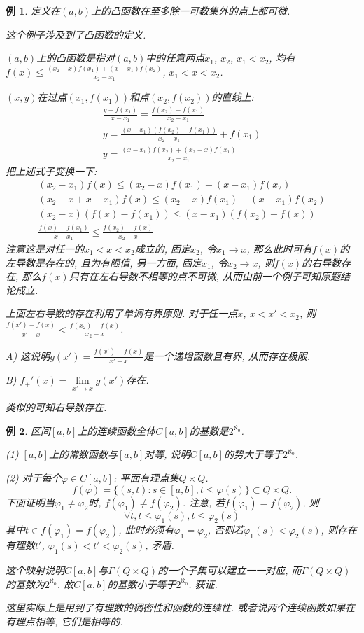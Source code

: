 \documentclass[12pt,a4paper,openany]{book}
\newtheorem{example}{例}
\begin{document}
\begin{example}
定义在$(a, b)$上的凸函数在至多除一可数集外的点上都可微.

这个例子涉及到了凸函数的定义.

$(a, b)$上的凸函数是指对$(a, b)$中的任意两点$x_1$, $x_2$, $x_1 < x_2$, 均有$f(x) \le \frac{(x_2 - x)f(x_1) + (x - x_1)f(x_2)}{x_2 - x_1}$, $x_1 < x < x_2$.

$(x, y)$在过点$(x_1, f(x_1))$和点$(x_2, f(x_2))$的直线上:
\begin{gather*}
\frac{y - f(x_1)}{x - x_1} = \frac{f(x_2) - f(x_1)}{x_2 - x_1} \\
y = \frac{(x - x_1)(f(x_2) - f(x_1))}{x_2 - x_1} + f(x_1) \\
y = \frac{(x - x_1)f(x_2) + (x_2 - x)f(x_1)}{x_2 - x_1}
\end{gather*}
把上述式子变换一下:
\begin{gather*}
(x_2 - x_1)f(x) \le (x_2 - x)f(x_1) + (x - x_1)f(x_2) \\
(x_2 - x + x - x_1)f(x) \le (x_2 - x)f(x_1) + (x - x_1)f(x_2) \\
(x_2 - x)(f(x) - f(x_1)) \le (x - x_1)(f(x_2) - f(x)) \\
\frac{f(x) - f(x_1)}{x - x_1} \le \frac{f(x_2) - f(x)}{x_2 - x}
\end{gather*}
注意这是对任一的$x_1 < x < x_2$成立的, 固定$x_2$, 令$x_1 \rightarrow x$, 那么此时可有$f(x)$的左导数是存在的, 且为有限值, 另一方面, 固定$x_1$, 令$x_2 \rightarrow x$, 则$f(x)$的右导数存在, 那么$f(x)$只有在左右导数不相等的点不可微, 从而由前一个例子可知原题结论成立. 

上面左右导数的存在利用了单调有界原则. 对于任一点$x$, $x < x' < x_2$, 则$\frac{f(x') - f(x)}{x'  - x} < \frac{f(x_2) - f(x)}{x_2 - x}$.

A) 这说明$g(x') = \frac{f(x') - f(x)}{x' - x}$是一个递增函数且有界, 从而存在极限.

B) $f_+'(x) = \lim\limits_{x' \rightarrow x}{g(x')}$存在.

类似的可知右导数存在.
\end{example}

\begin{example}
区间$[a, b]$上的连续函数全体$C[a, b]$的基数是$2^{\aleph_0}$.

(1) $[a, b]$上的常数函数与$[a, b]$对等, 说明$C[a,b]$的势大于等于$2^{\aleph_0}$.

(2) 对于每个$\varphi \in C[a, b]$: 平面有理点集$Q \times Q$.
$$
f(\varphi) = \{ (s, t) : s \in [a, b], t \le \varphi(s) \} \subset Q \times Q.
$$
下面证明当$\varphi_1 \neq \varphi_2$时, $f(\varphi_1) \neq f(\varphi_2)$. 注意, 若$f(\varphi_1) = f(\varphi_2)$, 则
$$
\forall t, t \le \varphi_1(s), t \le \varphi_2(s)
$$
其中$t \in f(\varphi_1) = f(\varphi_2)$, 此时必须有$\varphi_1 = \varphi_2$, 否则若$\varphi_1(s) < \varphi_2(s)$, 则存在有理数$t'$, $\varphi_1(s) < t' < \varphi_2(s)$, 矛盾.

这个映射说明$C[a, b]$与$\Gamma(Q \times Q)$的一个子集可以建立一一对应, 而$\Gamma(Q \times Q)$的基数为$2^{\aleph_0}$. 故$C[a, b]$的基数小于等于$2^{\aleph_0}$. 获证.

这里实际上是用到了有理数的稠密性和函数的连续性. 或者说两个连续函数如果在有理点相等, 它们是相等的.
\end{example}
\end{document}
